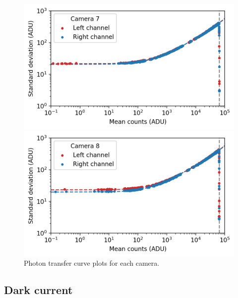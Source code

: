 \begin{colsection}
\begin{colsection}
\begin{figure}[p]
\begin{center}
        \begin{minipage}[t]{0.49\textwidth}\vspace{10pt}
            \includegraphics[width=\linewidth]{images/detectors/ptc_7.png}
        \end{minipage}
        \begin{minipage}[t]{0.49\textwidth}\vspace{10pt}
            \includegraphics[width=\linewidth]{images/detectors/ptc_8.png}
        \end{minipage}
    \end{center}
    \caption[Photon transfer curve plots]{
        Photon transfer curve plots for each camera.
        }\label{fig:ptcs}
\end{figure}

\clearpage

\end{colsection}

\newpage
\subsection{Dark current}
\label{sec:dc}
\begin{colsection}


\end{colsection}
\end{colsection}
